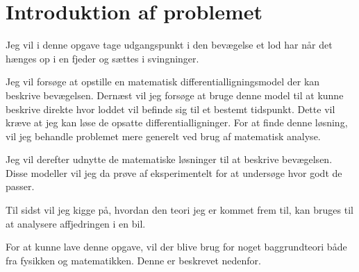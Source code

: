 \chapter{Introduktion af problemet}
Jeg vil i denne opgave tage udgangspunkt i den bevægelse et lod har når det hænges op i en fjeder og sættes i svingninger.

Jeg vil forsøge at opstille en matematisk differentialligningsmodel der kan beskrive bevægelsen.
Dernæst vil jeg forsøge at bruge denne model til at kunne beskrive direkte hvor loddet vil befinde sig til et bestemt tidspunkt. 
Dette vil kræve at jeg kan løse de opsatte differentialligninger. 
For at finde denne løsning, vil jeg behandle problemet mere generelt ved brug af matematisk analyse. 

Jeg vil derefter udnytte de matematiske løsninger til at beskrive bevægelsen.
Disse modeller vil jeg da prøve af eksperimentelt for at undersøge hvor godt de passer. 

Til sidst vil jeg kigge på, hvordan den teori jeg er kommet frem til, kan bruges til at analysere affjedringen i en bil. 
\vspace{1cm}

For at kunne lave denne opgave, vil der blive brug for noget baggrundteori både fra fysikken og matematikken. 
Denne er beskrevet nedenfor.


